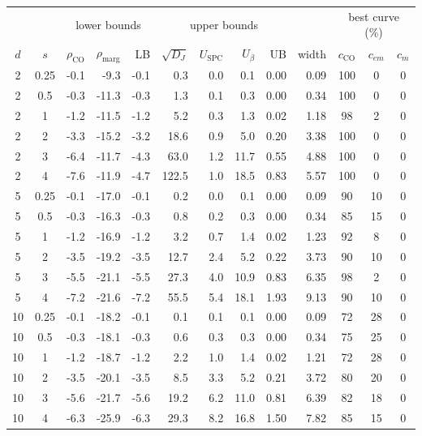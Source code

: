 \begin{tabular}{cc rrr rrrr r ccc}
\toprule
 & & \multicolumn{3}{c}{lower bounds} & \multicolumn{4}{c}{upper bounds} & & \multicolumn{3}{c}{best curve (\%)}\\
\cmidrule(lr){3-5}\cmidrule(lr){6-9}\cmidrule(lr){11-13}
$d$ & $s$ & $\rho_{\mathrm{CO}}$ & $\rho_{\mathrm{marg}}$ & LB & $\sqrt{D_J}$ & $U_{\mathrm{SPC}}$ & $U_\beta$ & UB & width & $c_{\mathrm{CO}}$ & $c_{em}$ & $c_m$\\
\midrule
2 & 0.25 & -0.1 & -9.3 & -0.1 & 0.3 & 0.0 & 0.1 & 0.00 & 0.09 & 100 & 0 & 0\\
2 & 0.5 & -0.3 & -11.3 & -0.3 & 1.3 & 0.1 & 0.3 & 0.00 & 0.34 & 100 & 0 & 0\\
2 & 1 & -1.2 & -11.5 & -1.2 & 5.2 & 0.3 & 1.3 & 0.02 & 1.18 & 98 & 2 & 0\\
2 & 2 & -3.3 & -15.2 & -3.2 & 18.6 & 0.9 & 5.0 & 0.20 & 3.38 & 100 & 0 & 0\\
2 & 3 & -6.4 & -11.7 & -4.3 & 63.0 & 1.2 & 11.7 & 0.55 & 4.88 & 100 & 0 & 0\\
2 & 4 & -7.6 & -11.9 & -4.7 & 122.5 & 1.0 & 18.5 & 0.83 & 5.57 & 100 & 0 & 0\\
5 & 0.25 & -0.1 & -17.0 & -0.1 & 0.2 & 0.0 & 0.1 & 0.00 & 0.09 & 90 & 10 & 0\\
5 & 0.5 & -0.3 & -16.3 & -0.3 & 0.8 & 0.2 & 0.3 & 0.00 & 0.34 & 85 & 15 & 0\\
5 & 1 & -1.2 & -16.9 & -1.2 & 3.2 & 0.7 & 1.4 & 0.02 & 1.23 & 92 & 8 & 0\\
5 & 2 & -3.5 & -19.2 & -3.5 & 12.7 & 2.4 & 5.2 & 0.22 & 3.73 & 90 & 10 & 0\\
5 & 3 & -5.5 & -21.1 & -5.5 & 27.3 & 4.0 & 10.9 & 0.83 & 6.35 & 98 & 2 & 0\\
5 & 4 & -7.2 & -21.6 & -7.2 & 55.5 & 5.4 & 18.1 & 1.93 & 9.13 & 90 & 10 & 0\\
10 & 0.25 & -0.1 & -18.2 & -0.1 & 0.1 & 0.1 & 0.1 & 0.00 & 0.09 & 72 & 28 & 0\\
10 & 0.5 & -0.3 & -18.1 & -0.3 & 0.6 & 0.3 & 0.3 & 0.00 & 0.34 & 75 & 25 & 0\\
10 & 1 & -1.2 & -18.7 & -1.2 & 2.2 & 1.0 & 1.4 & 0.02 & 1.21 & 72 & 28 & 0\\
10 & 2 & -3.5 & -20.1 & -3.5 & 8.5 & 3.3 & 5.2 & 0.21 & 3.72 & 80 & 20 & 0\\
10 & 3 & -5.6 & -21.7 & -5.6 & 19.2 & 6.2 & 11.0 & 0.81 & 6.39 & 82 & 18 & 0\\
10 & 4 & -6.3 & -25.9 & -6.3 & 29.3 & 8.2 & 16.8 & 1.50 & 7.82 & 85 & 15 & 0\\
\bottomrule
\end{tabular}